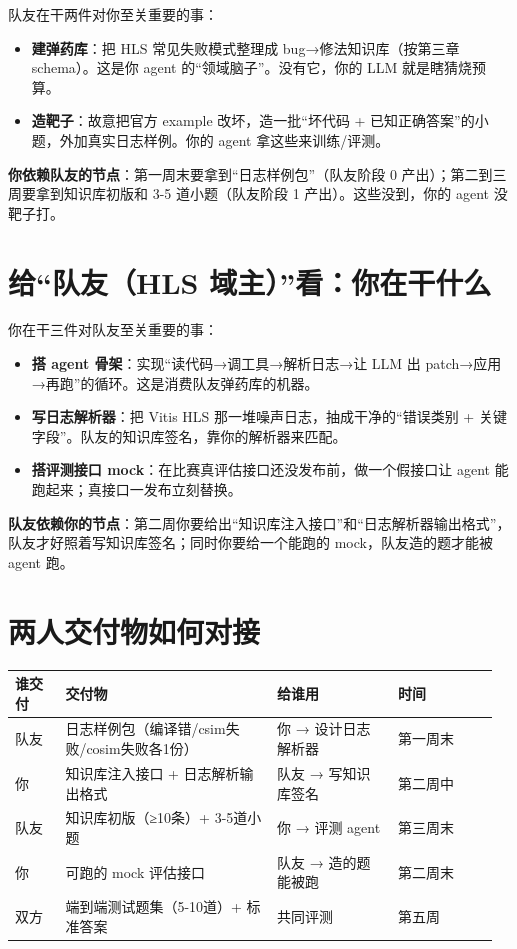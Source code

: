 \documentclass[12pt,a4paper]{ctexbook}
\begin{document}
队友在干两件对你至关重要的事：

\begin{itemize}
\item \textbf{建弹药库}：把 HLS 常见失败模式整理成 bug→修法知识库（按第三章 schema）。这是你 agent 的“领域脑子”。没有它，你的 LLM 就是瞎猜烧预算。
\item \textbf{造靶子}：故意把官方 example 改坏，造一批“坏代码 + 已知正确答案”的小题，外加真实日志样例。你的 agent 拿这些来训练/评测。
\end{itemize}

\textbf{你依赖队友的节点}：第一周末要拿到“日志样例包”（队友阶段 0 产出）；第二到三周要拿到知识库初版和 3-5 道小题（队友阶段 1 产出）。这些没到，你的 agent 没靶子打。

\section{给“队友（HLS 域主）”看：你在干什么}

你在干三件对队友至关重要的事：

\begin{itemize}
\item \textbf{搭 agent 骨架}：实现“读代码→调工具→解析日志→让 LLM 出 patch→应用→再跑”的循环。这是消费队友弹药库的机器。
\item \textbf{写日志解析器}：把 Vitis HLS 那一堆噪声日志，抽成干净的“错误类别 + 关键字段”。队友的知识库签名，靠你的解析器来匹配。
\item \textbf{搭评测接口 mock}：在比赛真评估接口还没发布前，做一个假接口让 agent 能跑起来；真接口一发布立刻替换。
\end{itemize}

\textbf{队友依赖你的节点}：第二周你要给出“知识库注入接口”和“日志解析器输出格式”，队友才好照着写知识库签名；同时你要给一个能跑的 mock，队友造的题才能被 agent 跑。

\section{两人交付物如何对接}

\begin{longtable}{@{}p{0.10\linewidth}p{0.42\linewidth}p{0.24\linewidth}p{0.20\linewidth}@{}}
\toprule
\textbf{谁交付} & \textbf{交付物} & \textbf{给谁用} & \textbf{时间} \\
\midrule
\endhead
队友 & 日志样例包（编译错/csim失败/cosim失败各1份） & 你 → 设计日志解析器 & 第一周末 \\
你 & 知识库注入接口 + 日志解析输出格式 & 队友 → 写知识库签名 & 第二周中 \\
队友 & 知识库初版（≥10条）+ 3-5道小题 & 你 → 评测 agent & 第三周末 \\
你 & 可跑的 mock 评估接口 & 队友 → 造的题能被跑 & 第二周末 \\
双方 & 端到端测试题集（5-10道）+ 标准答案 & 共同评测 & 第五周 \\
\bottomrule
\end{longtable}
\end{document}
